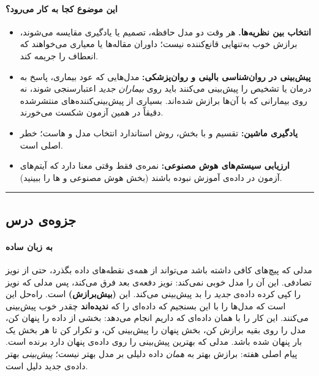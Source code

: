 \paragraph{این موضوع کجا به کار می‌رود؟}

\begin{itemize}
\tightlist
\item
  \textbf{انتخاب بین نظریه‌ها.} هر وقت دو مدل حافظه، تصمیم یا یادگیری
  مقایسه می‌شوند، برازش خوب به‌تنهایی قانع‌کننده نیست؛ داوران مقاله‌ها
   یا معیاری می‌خواهند که انعطاف را جریمه کند.
\item
  \textbf{پیش‌بینی در روان‌شناسی بالینی و روان‌پزشکی:} مدل‌هایی که عود
  بیماری، پاسخ به درمان یا تشخیص را پیش‌بینی می‌کنند باید روی
  \emph{بیماران جدید} اعتبارسنجی شوند، نه روی بیمارانی که با آن‌ها برازش
  شده‌اند. بسیاری از پیش‌بینی‌کننده‌های منتشرشده دقیقاً در همین آزمون شکست
  می‌خورند.
\item
  \textbf{یادگیری ماشین:} تقسیم  و
   با  بخش، روش استاندارد انتخاب مدل و
  هاست؛  خطر اصلی است.
\item
  \textbf{ارزیابی سیستم‌های هوش مصنوعی:} نمره‌ی  فقط وقتی
  معنا دارد که آیتم‌های آزمون در داده‌ی آموزش نبوده باشند (بخش هوش مصنوعی
  و ها را ببینید).
\end{itemize}

\begin{center}\rule{0.5\linewidth}{0.5pt}\end{center}


\subsection{جزوه‌ی درس}

\paragraph{به زبان ساده}

مدلی که پیچ‌های کافی داشته باشد می‌تواند از همه‌ی نقطه‌های داده بگذرد، حتی
از نویز تصادفی. این آن را مدل خوبی نمی‌کند: نویز دفعه‌ی بعد فرق می‌کند، پس
مدلی که نویز را کپی کرده داده‌ی \emph{جدید} را بد پیش‌بینی می‌کند. این
\textbf{ (بیش‌برازش)} است. راه‌حل این است که مدل‌ها را با
این بسنجیم که داده‌ای را که \textbf{ندیده‌اند} چقدر خوب پیش‌بینی می‌کنند.
\textbf{} این کار را با همان داده‌ای که داریم انجام
می‌دهد: بخشی از داده را پنهان کن، مدل را روی بقیه برازش کن، بخش پنهان را
پیش‌بینی کن، و تکرار کن تا هر بخش یک بار پنهان شده باشد. مدلی که بهترین
پیش‌بینی را روی داده‌ی پنهان دارد برنده است. پیام اصلی هفته: برازش بهتر به
\emph{همان} داده دلیلی بر مدل بهتر نیست؛ \emph{پیش‌بینی} بهتر داده‌ی جدید
دلیل است.

